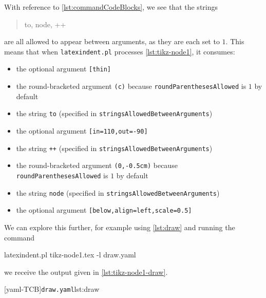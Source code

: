 	\begin{minipage}{.45\textwidth}
	\end{minipage}
	\hfill
	\begin{minipage}{.45\textwidth}
	\end{minipage}

	With reference to \vref{lst:commandCodeBlocks}, we see that the strings
	\begin{quote}
		to, node, ++
	\end{quote}
	are all allowed to appear between arguments, as they are each set to $1$. This means that when \texttt{latexindent.pl}
	processes \cref{lst:tikz-node1}, it consumes:
	\begin{itemize}
		\item the optional argument \lstinline![thin]!
		\item the round-bracketed argument \lstinline!(c)! because \texttt{roundParenthesesAllowed} is $1$ by default
		\item the string \lstinline!to! (specified in \texttt{stringsAllowedBetweenArguments})
		\item the optional argument \lstinline![in=110,out=-90]!
		\item the string \lstinline!++! (specified in \texttt{stringsAllowedBetweenArguments})
		\item the round-bracketed argument \lstinline!(0,-0.5cm)! because \texttt{roundParenthesesAllowed} is $1$ by default
		\item the string \lstinline!node! (specified in \texttt{stringsAllowedBetweenArguments})
		\item the optional argument \lstinline![below,align=left,scale=0.5]!
	\end{itemize}

	We can explore this further, for example using \cref{lst:draw} and running the command
	\begin{commandshell}
latexindent.pl tikz-node1.tex -l draw.yaml  
\end{commandshell}
	we receive the output given in \cref{lst:tikz-node1-draw}.

	\begin{minipage}{.45\textwidth}
	\end{minipage}
	\hfill
	\begin{minipage}{.45\textwidth}
		[yaml-TCB]{\texttt{draw.yaml}}{lst:draw}
	\end{minipage}

